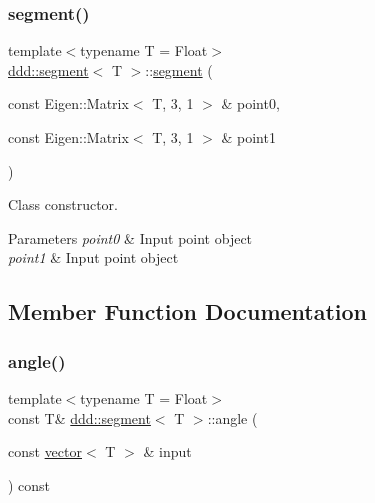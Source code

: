 \subsubsection{\texorpdfstring{segment()}{segment()}\hspace{0.1cm}{\footnotesize\ttfamily [2/2]}}
{\footnotesize\ttfamily template$<$typename T = Float$>$ \\
\hyperlink{classddd_1_1segment}{ddd\+::segment}$<$ T $>$\+::\hyperlink{classddd_1_1segment}{segment} (\begin{DoxyParamCaption}\item[{const Eigen\+::\+Matrix$<$ T, 3, 1 $>$ \&}]{point0,  }\item[{const Eigen\+::\+Matrix$<$ T, 3, 1 $>$ \&}]{point1 }\end{DoxyParamCaption})\hspace{0.3cm}{\ttfamily [inline]}}



Class constructor. 


\begin{DoxyParams}{Parameters}
{\em point0} & Input point object \\
\hline
{\em point1} & Input point object \\
\hline
\end{DoxyParams}


\subsection{Member Function Documentation}
\mbox{\label{classddd_1_1segment_a87c35ebcb1818d0958e51868a60c4181}} 
\subsubsection{\texorpdfstring{angle()}{angle()}\hspace{0.1cm}{\footnotesize\ttfamily [1/5]}}
{\footnotesize\ttfamily template$<$typename T = Float$>$ \\
const T\& \hyperlink{classddd_1_1segment}{ddd\+::segment}$<$ T $>$\+::angle (\begin{DoxyParamCaption}\item[{const \hyperlink{classddd_1_1vector}{vector}$<$ T $>$ \&}]{input }\end{DoxyParamCaption}) const\hspace{0.3cm}{\ttfamily [inline]}}



